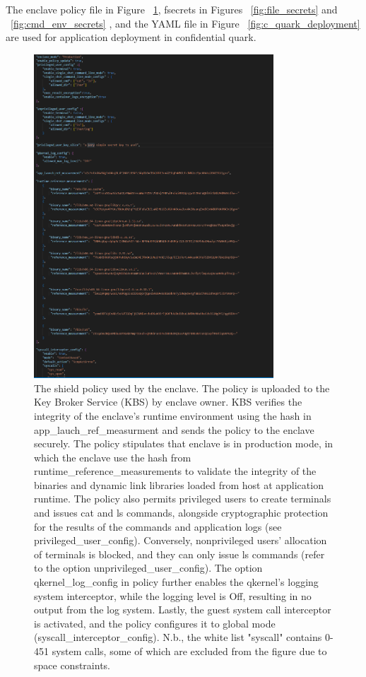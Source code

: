 The enclave policy file\cite*{enclave_policy} in Figure ~\ref{fig:generic_policy}, fsecrets in Figures ~\ref{fig:file_secrets}  and ~\ref{fig:cmd_env_secrets} \cite*{kbs_secret}, and the YAML file\cite*{confidentail_quark_yaml} in Figure ~\ref{fig:c_quark_deployment}  are used for 
application deployment in confidential quark. 
\begin{figure}[H]
    \centering
    \includegraphics[width=0.8\textwidth, scale=0.8]{images/generic_policy.PNG}
    \caption[Qkernel Attestation Report Syscall Benchmark Deployment]{The shield policy used by the enclave.  The policy is uploaded to the Key Broker Service (KBS) by enclave owner. KBS verifies the integrity of the enclave's runtime environment 
    using the hash in app{\_}lauch{\_}ref{\_}measurment and sends the policy to the enclave securely. The policy stipulates that enclave is in production mode, in which the enclave use the hash from runtime\_reference\_measurements to validate the 
    integrity of the binaries and dynamic link libraries loaded from host at application runtime. The policy also permits privileged users to create terminals and issues cat and ls commands, alongside cryptographic protection for the results 
    of the commands and application logs (see privileged{\_}user{\_}config). Conversely, non{\-}privileged users' allocation of terminals is blocked, and they can only issue ls commands (refer to the option unprivileged{\_}user{\_}config). The option 
    qkernel\_log\_config in policy further enables the qkernel's logging system interceptor, while the logging level is Off, resulting in no output from the log system. Lastly, the guest system call interceptor is activated, and the policy configures 
    it to global mode (syscall{\_}interceptor{\_}config). N.b., the white list "syscall" contains 0-451 system calls, some of which are excluded from the figure due to space constraints.}
    \label{fig:generic_policy}
\end{figure}
